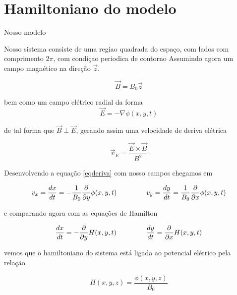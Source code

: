 \documentclass[12pt,a4paper]{article}
\begin{document}
\clearpage

\section{Hamiltoniano do modelo} %

Nosso modelo 

Nosso sistema consiste de uma regiao quadrada do espaço, com lados com comprimento $2\pi$, com condiçao periodica de contorno
Assumindo agora um campo magnético na direção $\vec{z}$.

\begin{equation}
\vec{B} = B_0 \vec{z}
\end{equation}

\noindent bem como um campo elétrico radial da forma 
\begin{equation}
\vec{E} = - \nabla \phi(x,y,t)    
\end{equation}

\noindent de tal forma que $\vec{B} \perp \vec{E}$, gerando assim uma velocidade de deriva elétrica

\begin{equation}
\vec{v}_E = \frac{\vec{E} \times \vec{B}}{B^2}    
\label{eqderiva}
\end{equation}

Desenvolvendo a equação \ref{eqderiva} com nosso campos chegamos em

\begin{equation}
v_x = \frac{dx}{dt} = -\frac{1}{B_0}\frac{\partial}{\partial y} \phi(x,y,t) \hspace{1.5cm} v_y = \frac{dy}{dt} = \frac{1}{B_0}\frac{\partial}{\partial x} \phi(x,y,t)
\end{equation}

\noindent e comparando agora com as equações de Hamilton

\begin{equation}
\frac{dx}{dt} = -\frac{\partial}{\partial y} H(x,y,t) \hspace{1.5cm}  \frac{dy}{dt} = \frac{\partial}{\partial x} H(x,y,t)
\label{eqvs}
\end{equation}

\noindent vemos que o hamiltoniano do sistema  está ligada ao potencial elétrico pela relação

\begin{equation}
H(x,y,z) = \frac{\phi(x,y,z)}{B_0}
\end{equation}
\end{document}
